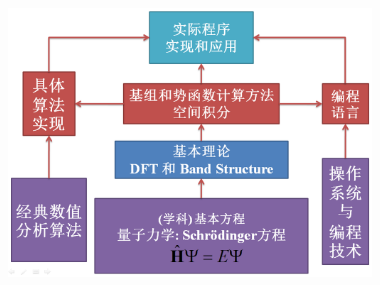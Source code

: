 \documentclass[cjk,slidestop,compress,mathserif,blue]{beamer}
\begin{document}
\frame
{
\begin{figure}[h!]
\vspace*{-0.25in}
\centering
\includegraphics[height=2.80in,width=4.95in,viewport=5 3 1250 780,clip]{Figures/Method_Procedure.png}
\label{Method-Procedure}
\end{figure}
}
\end{document}
